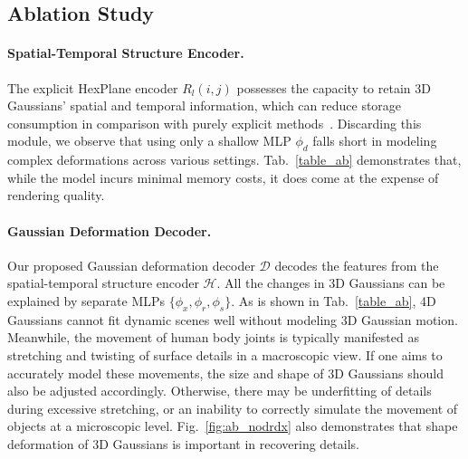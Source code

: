 \subsection{Ablation Study}
\label{subsec:ablation study}
\paragraph{Spatial-Temporal Structure Encoder.}
The explicit HexPlane encoder $R_l(i,j)$ possesses the capacity to retain 3D Gaussians' spatial and temporal information, which can reduce storage consumption in comparison with purely explicit methods~\cite{dynamic3dgs}. Discarding this module, we observe that using only a shallow MLP $\phi_d$ falls short in modeling complex deformations across various settings. Tab.~\ref{table_ab} demonstrates that, while the model incurs minimal memory costs, it does come at the expense of rendering quality. 


\vspace{-3pt}
\paragraph{Gaussian Deformation Decoder.}
Our proposed Gaussian deformation decoder $\mathcal{D}$ decodes the features from the spatial-temporal structure encoder $\mathcal{H}$. All the changes in 3D Gaussians can be explained by separate MLPs $\{\phi_x,\phi_r,\phi_s\}$. As is shown in Tab.~\ref{table_ab}, 4D Gaussians cannot fit dynamic scenes well without modeling 3D Gaussian motion. Meanwhile, the movement of human body joints is typically manifested as stretching and twisting of surface details in a macroscopic view. If one aims to accurately model these movements, the size and shape of 3D Gaussians should also be adjusted accordingly. Otherwise, there may be underfitting of details during excessive stretching, or an inability to correctly simulate the movement of objects at a microscopic level.  Fig.~\ref{fig:ab_nodrdx} also demonstrates that shape deformation of 3D Gaussians is important in recovering details.
\vspace{-3pt}
